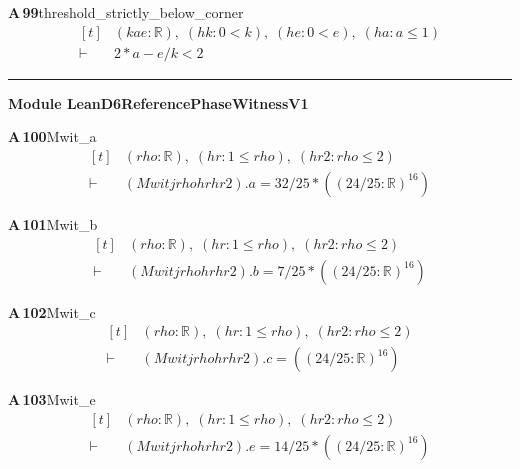 \documentclass[conference]{IEEEtran}
\theoremstyle{definition}
\newcommand{\lean}[1]{\textsf{\footnotesize #1}}
\begin{document}
\noindent\textbf{A\,99}\quad\lean{threshold\_strictly\_below\_corner}
{\footnotesize\[ \begin{aligned}[t]
&(\mathit{k} \mathit{a} \mathit{e} : \mathbb{R} ),\; (\mathit{hk} : 0 < \mathit{k}),\; (\mathit{he} : 0 < \mathit{e}),\; (\mathit{ha} : \mathit{a} \leq 1)\\
\vdash\;&2*\mathit{a}-\mathit{e}/\mathit{k} < 2
\end{aligned} \]}

\vspace{4pt}\noindent\rule{\columnwidth}{0.4pt}\par\vspace{2pt}
\noindent\textbf{Module \lean{LeanD6ReferencePhaseWitnessV1}}\par\vspace{3pt}

\noindent\textbf{A\,100}\quad\lean{Mwit\_a}
{\footnotesize\[ \begin{aligned}[t]
&(\mathit{rho} : \mathbb{R} ),\; (\mathit{hr} : 1 \leq \mathit{rho}),\; (\mathit{hr2} : \mathit{rho} \leq 2)\\
\vdash\;&(\mathit{Mwit} \mathit{j} \mathit{rho} \mathit{hr} \mathit{hr2}).\mathit{a} = 32/25*((24/25:\mathbb{R} )^{16})
\end{aligned} \]}

\noindent\textbf{A\,101}\quad\lean{Mwit\_b}
{\footnotesize\[ \begin{aligned}[t]
&(\mathit{rho} : \mathbb{R} ),\; (\mathit{hr} : 1 \leq \mathit{rho}),\; (\mathit{hr2} : \mathit{rho} \leq 2)\\
\vdash\;&(\mathit{Mwit} \mathit{j} \mathit{rho} \mathit{hr} \mathit{hr2}).\mathit{b} = 7/25*((24/25:\mathbb{R} )^{16})
\end{aligned} \]}

\noindent\textbf{A\,102}\quad\lean{Mwit\_c}
{\footnotesize\[ \begin{aligned}[t]
&(\mathit{rho} : \mathbb{R} ),\; (\mathit{hr} : 1 \leq \mathit{rho}),\; (\mathit{hr2} : \mathit{rho} \leq 2)\\
\vdash\;&(\mathit{Mwit} \mathit{j} \mathit{rho} \mathit{hr} \mathit{hr2}).\mathit{c} = ((24/25:\mathbb{R} )^{16})
\end{aligned} \]}

\noindent\textbf{A\,103}\quad\lean{Mwit\_e}
{\footnotesize\[ \begin{aligned}[t]
&(\mathit{rho} : \mathbb{R} ),\; (\mathit{hr} : 1 \leq \mathit{rho}),\; (\mathit{hr2} : \mathit{rho} \leq 2)\\
\vdash\;&(\mathit{Mwit} \mathit{j} \mathit{rho} \mathit{hr} \mathit{hr2}).\mathit{e} = 14/25*((24/25:\mathbb{R} )^{16})
\end{aligned} \]}
\end{document}
